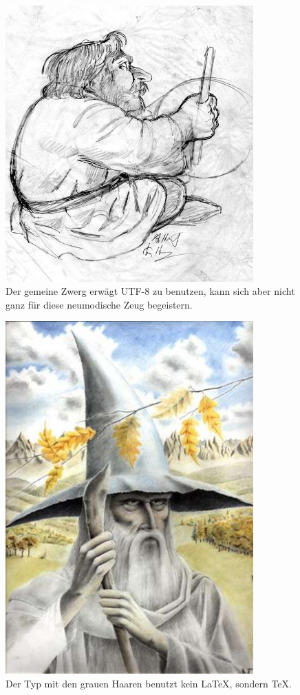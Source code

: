\documentclass[a4paper]{article}
\begin{document}
\begin{figure}[htb]
\centering
\includegraphics[width=0.85\textwidth]{zwerg}
\caption[gemeiner Zwerg]{Der gemeine Zwerg erwägt UTF-8 zu benutzen, kann sich aber nicht ganz für diese neumodische Zeug begeistern.}
\label{43cb4f4f-3315-44a6-9f11-4d8a9710fd21}
\end{figure}

\begin{figure}[htb]
\centering
\includegraphics[width=0.85\textwidth]{gandalf}
\caption[\TeX\ Benutzer]{Der Typ mit den grauen Haaren benutzt kein \LaTeX, sondern \TeX.}
\label{fig:texuser}
\end{figure}
\end{document}

